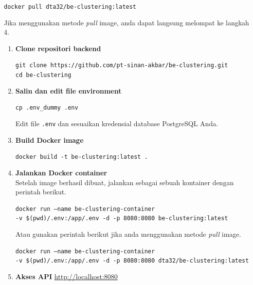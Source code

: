 \documentclass{article}
\newcommand{\inlinecode}[1]{%
    \begin{mdframed}[style=codestyle]
    \texttt{\small #1}
    \end{mdframed}
}
\begin{document}
    \inlinecode{docker pull dta32/be-clustering:latest}
    Jika menggunakan metode \textit{pull} image, anda dapat langsung melompat ke langkah 4.
    \begin{enumerate}
        \item \textbf{Clone repositori backend}

        \begin{mdframed}[style=codestyle]
            \small\texttt{git clone https://github.com/pt-sinan-akbar/be-clustering.git} \\
            \small\texttt{cd be-clustering}
        \end{mdframed}

        \item \textbf{Salin dan edit file environment}

        \inlinecode{cp .env\_dummy .env}

        Edit file \texttt{.env} dan sesuaikan kredensial database PostgreSQL Anda.

        \item \textbf{Build Docker image}

        \inlinecode{docker build -t be-clustering:latest .}

        \item \textbf{Jalankan Docker container} \\
        Setelah image berhasil dibuat, jalankan sebagai sebuah kontainer dengan perintah berikut.

        \begin{mdframed}[style=codestyle]
            \small\texttt{docker run --name be-clustering-container} \\
            \small\texttt{-v \$(pwd)/.env:/app/.env -d -p 8080:8080 be-clustering:latest}
        \end{mdframed}

        Atau gunakan perintah berikut jika anda menggunakan metode \textit{pull} image.

        \begin{mdframed}[style=codestyle]
            \small\texttt{docker run --name be-clustering-container} \\
            \small\texttt{-v \$(pwd)/.env:/app/.env -d -p 8080:8080 dta32/be-clustering:latest}
        \end{mdframed}

        \item \textbf{Akses API}
        \url{http://localhost:8080}
    \end{enumerate}
\end{document}
